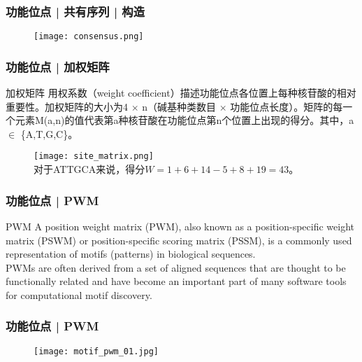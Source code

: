 \begin{frame}
  \frametitle{功能位点 | 共有序列 | 构造}
  \begin{figure}
    \centering
    \texttt{[image: consensus.png]}
  \end{figure}
\end{frame}

\begin{frame}
  \frametitle{功能位点 | 加权矩阵}
  \begin{block}{加权矩阵}
    用权系数（weight coefficient）描述功能位点各位置上每种核苷酸的相对重要性。加权矩阵的大小为4 $\times$ n（碱基种类数目 $\times$ 功能位点长度）。矩阵的每一个元素M(a,n)的值代表第a种核苷酸在功能位点第n个位置上出现的得分。其中，a $\in$ \{A,T,G,C\}。
  \end{block}
  \begin{figure}
    \centering
    \texttt{[image: site\_matrix.png]}
  \\ 对于ATTGCA来说，得分$W = 1 + 6 + 14 - 5 + 8 + 19 = 43$。
  \end{figure}
\end{frame}

\begin{frame}
  \frametitle{功能位点 | PWM}
  \begin{block}{PWM}
A position weight matrix (PWM), also known as a position-specific weight matrix (PSWM) or position-specific scoring matrix (PSSM), is a commonly used representation of motifs (patterns) in biological sequences.\\
\vspace{0.5em}
PWMs are often derived from a set of aligned sequences that are thought to be functionally related and have become an important part of many software tools for computational motif discovery.
  \end{block}
\end{frame}

\begin{frame}
  \frametitle{功能位点 | PWM}
  \begin{figure}
    \centering
    \texttt{[image: motif\_pwm\_01.jpg]}
  \end{figure}
\end{frame}

